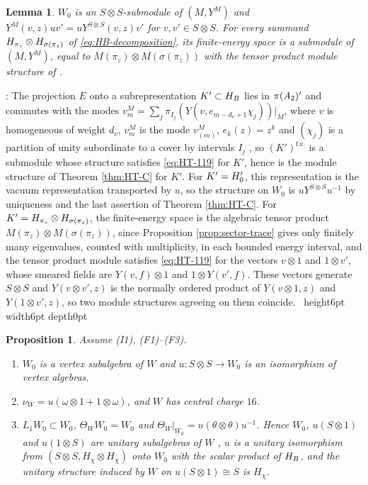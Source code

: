 \documentclass[leqno]{article}
\let\cal\relax
\newcommand{\cal}{\mathcal}
\newcommand{\qed}{\hfill \vrule height6pt  width6pt depth0pt}
\newcommand{\co}{\colon}
\newcommand{\ot}{\otimes}
\newtheorem{prop}[thm]{Proposition}
\newtheorem{lemma}[thm]{Lemma}
\newenvironment{proof}[1][]{\noindent {\it Proof #1} : }{\hbox{~}\qed
\smallskip
}
\numberwithin{equation}{section}
\begin{document}
\begin{lemma}
\label{lem:vacuum-module}
$W_0$ is an $S \ot S$-submodule of $(M,Y^M)$ and $Y^M(v,z)uv' = uY^{S \ot S}(v,z)v'$ for $v, v' \in S \ot S$. For every summand $\cal H_{\pi_z} \ot \cal H_{\sigma(\pi_z)}$ of \eqref{eq:HB-decomposition}, its finite-energy space is a submodule of $(M,Y^M)$, equal to $M(\pi_z) \ot M(\sigma(\pi_z))$ with the tensor product module structure of \cite[Section 4.7]{FHL93}.
\end{lemma}

\begin{proof}
The projection $E$ onto a subrepresentation $K' \subset \cal H_{\cal B}$ lies in $\pi(\cal A_2)'$ and commutes with the modes $v^M_m = \sum_j \pi_{I_j}(Y(v,e_{m-d_v+1}\chi_j))|_M$, where $v$ is homogeneous of weight $d_v$, $v^M_m$ is the mode $v^M_{(m)}$, $e_k(z) = z^k$ and $(\chi_j)$ is a partition of unity subordinate to a cover by intervals $I_j$ \cite[p.~72]{HeT25}, so $(K')^{\mathrm{f.e.}}$ is a submodule whose structure satisfies \eqref{eq:HT-119} for $K'$, hence is the module structure of Theorem \ref{thm:HT-C} for $K'$. For $K' = \cal H'_0$, this representation is the vacuum representation transported by $u$, so the structure on $W_0$ is $uY^{S \ot S}u^{-1}$ by uniqueness and the last assertion of Theorem \ref{thm:HT-C}. For $K' = \cal H_{\pi_z} \ot \cal H_{\sigma(\pi_z)}$, the finite-energy space is the algebraic tensor product $M(\pi_z) \ot M(\sigma(\pi_z))$, since Proposition \ref{prop:sector-trace} gives only finitely many eigenvalues, counted with multiplicity, in each bounded energy interval, and the tensor product module satisfies \eqref{eq:HT-119} for the vectors $v \ot 1$ and $1 \ot v'$, whose smeared fields are $Y(v,f) \ot 1$ and $1 \ot Y(v',f)$. These vectors generate $S \ot S$ and $Y(v \ot v',z)$ is the normally ordered product of $Y(v \ot 1,z)$ and $Y(1 \ot v',z)$, so two module structures agreeing on them coincide.
\end{proof}

\begin{prop}
\label{prop:identification}
Assume \textup{(I1)}, \textup{(F1)}--\textup{(F3)}.
\begin{enumerate}
\item $W_0$ is a vertex subalgebra of $W$ and $u \co S \ot S \to W_0$ is an isomorphism of vertex algebras.
\item $\nu_W = u(\omega \ot 1+1 \ot \omega)$, and $W$ has central charge $16$.
\item $L_1W_0 \subset W_0$, $\Theta_WW_0 = W_0$ and $\Theta_W|_{W_0} = u(\theta \ot \theta)u^{-1}$. Hence $W_0$, $u(S \ot 1)$ and $u(1 \ot S)$ are unitary subalgebras of $W$ \cite[Definition 5.22 p.~43]{CKLW18}, $u$ is a unitary isomorphism from $(S \ot S, H_\chi \ot H_\chi)$ onto $W_0$ with the scalar product of $\cal H_{\cal B}$, and the unitary structure induced by $W$ on $u(S \ot 1) \cong S$ is $H_\chi$.
\end{enumerate}
\end{prop}
\end{document}
